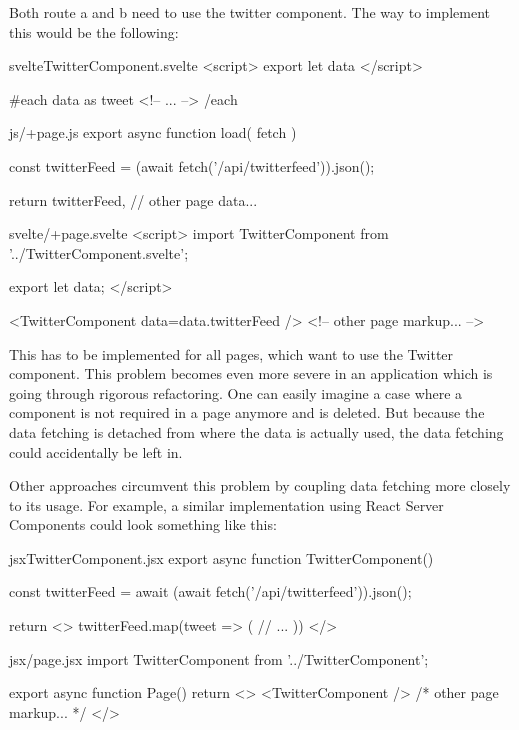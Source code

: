 Both route a and b need to use the twitter component. The way to implement this would be the following:

\begin{myminted}{svelte}{TwitterComponent.svelte}
<script>
    export let data
</script>

{#each data as tweet}
    <!-- ... -->
{/each}
\end{myminted}

\begin{myminted}{js}{/+page.js}
export async function load({ fetch }) {

    const twitterFeed = (await fetch('/api/twitterfeed')).json();

    return {
        twitterFeed,
        // other page data...
    }
}
\end{myminted}

\begin{myminted}{svelte}{/+page.svelte}
<script>
    import TwitterComponent from '../TwitterComponent.svelte';

    export let data;
</script>

<TwitterComponent data={data.twitterFeed} />
<!-- other page markup... -->
\end{myminted}

This has to be implemented for all pages, which want to use the Twitter component. This problem becomes even more severe in an application which is going through rigorous refactoring. One can easily imagine a case where a component is not required in a page anymore and is deleted. But because the data fetching is detached from where the data is actually used, the data fetching could accidentally be left in.

Other approaches circumvent this problem by coupling data fetching more closely to its usage. For example, a similar implementation using React Server Components could look something like this:

\begin{myminted}{jsx}{TwitterComponent.jsx}
export async function TwitterComponent() {
    const twitterFeed = await (await fetch('/api/twitterfeed')).json();

    return <>
        {twitterFeed.map(tweet => (
            // ...
        ))}
    </>
}
\end{myminted}

\begin{myminted}{jsx}{/page.jsx}
import TwitterComponent from '../TwitterComponent';

export async function Page() {
    return <>
        <TwitterComponent />
        { /* other page markup... */ }
    </>
}
\end{myminted}

